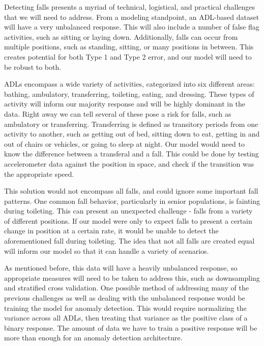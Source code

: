 \documentclass{llncs}
\begin{document}
	Detecting falls presents a myriad of technical, logistical, and practical challenges that we will need to address. From a modeling standpoint, an ADL-based dataset will have a very unbalanced response. This will also include a number of false flag activities, such as sitting or laying down. Additionally, falls can occur from multiple positions, such as standing, sitting, or many positions in between. This creates potential for both Type 1 and Type 2 error, and our model will need to be robust to both.
    
    ADLs encompass a wide variety of activities, categorized into six different areas: bathing, ambulatory, transferring, toileting, eating, and dressing. These types of activity will inform our majority response and will be highly dominant in the data. Right away we can tell several of these pose a risk for falls, such as ambulatory or transferring. Transferring is defined as transitory periods from one activity to another, such as getting out of bed, sitting down to eat, getting in and out of chairs or vehicles, or going to sleep at night. Our model would need to know the difference between a transferal and a fall. This could be done by testing accelerometer data against the position in space, and check if the transition was the appropriate speed. 
    
    This solution would not encompass all falls, and could ignore some important fall patterns. One common fall behavior, particularly in senior populations, is fainting during toileting. This can present an unexpected challenge - falls from a variety of different positions. If our model were only to expect falls to present a certain change in position at a certain rate, it would be unable to detect the aforementioned fall during toileting. The idea that not all falls are created equal will inform our model so that it can handle a variety of scenarios.
    
    As mentioned before, this data will have a heavily unbalanced response, so appropriate measures will need to be taken to address this, such as downsampling and stratified cross validation. One possible method of addressing many of the previous challenges as well as dealing with the unbalanced response would be training the model for anomaly detection. This would require normalizing the variance across all ADLs, then treating that variance as the positive class of a binary response. The amount of data we have to train a positive response will be more than enough for an anomaly detection architecture.
    
\end{document}
